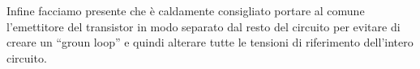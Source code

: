 Infine facciamo presente che è caldamente consigliato portare al comune l'emettitore del transistor in modo separato dal resto del circuito per evitare di creare un ``groun loop'' e quindi alterare tutte le tensioni di riferimento dell'intero circuito.



